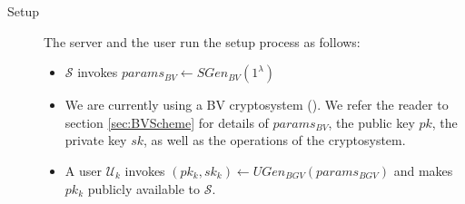 \begin{description}
	\item[Setup] The server and the user run the setup process as
	follows:
	\begin{itemize}




		\item $\mathcal{S}$ invokes $params_{BV} \gets
		SGen_{BV}(1^\lambda)$
		\item We are currently using a BV cryptosystem
		(\cite{brakerski2011fully}). We refer the reader to section
		\ref{sec:BVScheme} for details of $params_{BV}$, the public
		key $pk$, the private key $sk$, as well as the
		operations of the
		cryptosystem.
		\item A user $\mathcal{U}_k$ invokes $(pk_k,sk_k) \gets
		UGen_{BGV}(params_{BGV})$ and makes $pk_k$ publicly
		available to $\mathcal{S}$.




		\iffalse
		\item $\mathcal{S}$ invokes $params_{GSW} \gets
		SGen_{GSW}(1^\lambda)$
		\item We are currently using GSW cryptosystem
		(\cite{gentry2013homomorphic}).
		We refer the reader to section
		\missref{} for details of $params_{GSW}$, the public
		key $pk$, the private key $sk$, as well as the
		homomorphic operations of the
		cryptosystem.
		\item A user $\mathcal{U}_k$ invokes $(pk_k,sk_k) \gets
		UGen_{GSW}(params_{GSW})$ and make $pp_k$ publicly
		available to $\mathcal{S}$
		\fi



\end{itemize}
\end{description}
